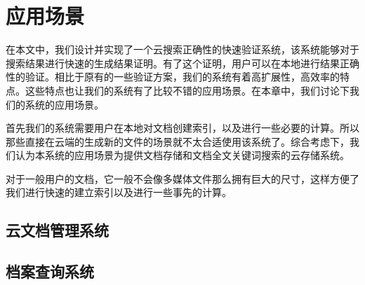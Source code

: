 \chapter{应用场景}
\label{chap:application}
在本文中，我们设计并实现了一个云搜索正确性的快速验证系统，该系统能够对于搜索结果进行快速的生成结果证明。有了这个证明，用户可以在本地进行结果正确性的验证。相比于原有的一些验证方案，我们的系统有着高扩展性，高效率的特点。这些特点也让我们的系统有了比较不错的应用场景。在本章中，我们讨论下我们的系统的应用场景。

首先我们的系统需要用户在本地对文档创建索引，以及进行一些必要的计算。所以那些直接在云端的生成新的文件的场景就不太合适使用该系统了。综合考虑下，我们认为本系统的应用场景为提供文档存储和文档全文关键词搜索的云存储系统。

对于一般用户的文档，它一般不会像多媒体文件那么拥有巨大的尺寸，这样方便了我们进行快速的建立索引以及进行一些事先的计算。


\section{云文档管理系统}

\section{档案查询系统}
